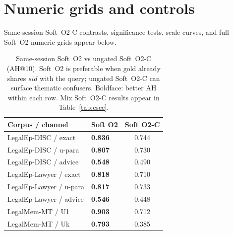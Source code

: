 \documentclass[preprint,12pt,authoryear]{elsarticle}
\newcommand{\compacttab}{\setlength{\tabcolsep}{4.5pt}\renewcommand{\arraystretch}{1.05}}
\begin{document}
\FloatBarrier



\clearpage
\appendix
\setcounter{table}{0}
\renewcommand{\thetable}{A.\arabic{table}}
\renewcommand{\theHtable}{A.\arabic{table}}
\section{Numeric grids and controls}\label{app:tables}
Same-session Soft~O2-C contrasts, significance tests, scale curves, and full Soft~O2 numeric grids appear below.

\begin{table}[htbp]
\centering
\caption{Same-session Soft~O2 vs ungated Soft~O2-C (AH@10). Soft~O2 is preferable when gold already shares $sid$ with the query; ungated Soft~O2-C can surface thematic confusers. Boldface: better AH within each row. Mix Soft~O2-C results appear in Table~\ref{tab:csce}.}
\label{tab:cluster_same}
\compacttab\footnotesize
\begin{tabular}{@{}llc@{}}
\toprule
\textbf{Corpus / channel} & \textbf{Soft O2} & \textbf{Soft O2-C} \\
\midrule
LegalEp-DISC / exact & \textbf{0.836} & 0.744 \\
LegalEp-DISC / u-para & \textbf{0.807} & 0.730 \\
LegalEp-DISC / advice & \textbf{0.548} & 0.490 \\
LegalEp-Lawyer / exact & \textbf{0.818} & 0.710 \\
LegalEp-Lawyer / u-para & \textbf{0.817} & 0.733 \\
LegalEp-Lawyer / advice & \textbf{0.546} & 0.448 \\
LegalMem-MT / U1 & \textbf{0.903} & 0.712 \\
LegalMem-MT / Uk & \textbf{0.793} & 0.385 \\
\bottomrule
\end{tabular}
\end{table}
\end{document}
